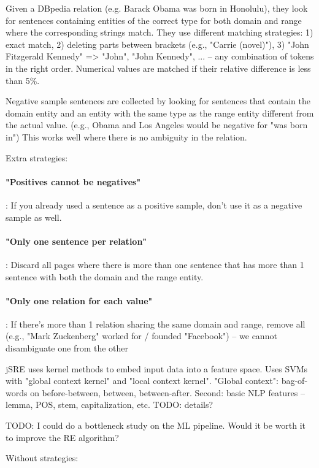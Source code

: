 Given a DBpedia relation (e.g. Barack Obama was born in Honolulu), they look for
sentences containing entities of the correct type for both domain and range
where the corresponding strings match. They use different matching strategies:
1) exact match, 2) deleting parts between brackets (e.g., "Carrie (novel)"), 3)
"John Fitzgerald Kennedy" => "John", "John Kennedy", ... -- any combination
of tokens in the right order. Numerical values are matched if their relative
difference is less than 5\%.

Negative sample sentences are collected by looking for sentences that contain
the domain entity and an entity with the same type as the range entity different
from the actual value. (e.g., Obama and Los Angeles would be negative for "was
born in") This works well where there is no ambiguity in the relation.

Extra strategies:

\paragraph{"Positives cannot be negatives"}: If you already used a sentence as a
positive sample, don't use it as a negative sample as well.

\paragraph{"Only one sentence per relation"}: Discard all pages where there is
more than one sentence that has more than 1 sentence with both the domain and
the range entity.

\paragraph{"Only one relation for each value"}: If there's more than 1 relation
sharing the same domain and range, remove all (e.g., "Mark Zuckenberg" worked
for / founded "Facebook") -- we cannot disambiguate one from the other

jSRE uses kernel methods to embed input data into a feature space. Uses SVMs
with "global context kernel" and "local context kernel". "Global context":
bag-of-words on before-between, between, between-after. Second: basic NLP
features -- lemma, POS, stem, capitalization, etc.
TODO: details?

TODO: I could do a bottleneck study on the ML pipeline. Would it be worth it to
improve the RE algorithm?

Without strategies:

